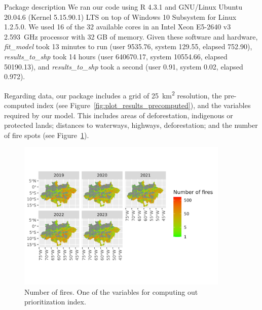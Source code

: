 \documentclass[20pt]{beamer}
\begin{document}
\begin{frame}[fragile,t]
\begin{columns}[t]
\begin{column}{0.33\linewidth}
\begin{block}{Package description}
We ran our code using \textsf{R} 4.3.1 and GNU/Linux Ubuntu 20.04.6 (Kernel 5.15.90.1) LTS on top of Windows 10 Subsystem for Linux 1.2.5.0. 
We used 16 of the 32 available cores in an Intel Xeon E5-2640 v3 2.593~GHz processor with 32 GB of memory.
Given these software and hardware, \textit{fit\_model} took 13 minutes to run (user 9535.76, system 129.55, elapsed 752.90),  \textit{results\_to\_shp} took 14 hours (user 640670.17, system 10554.66, elapsed 50190.13), and \textit{results\_to\_shp} took a second (user 0.91,  system 0.02, elapsed 0.972).

Regarding data, our package includes 
a grid of 25~\unit{\km\squared} resolution, the pre-computed index (see Figure~\ref{fig:plot_results_precomputed}),
and the variables required by our model. 
This includes areas of deforestation, indigenous or protected lands; distances to waterways, highways, deforestation; and the number of fire spots (see Figure~\ref{fig:plot_fires}).

\vspace{1cm}
\begin{figure}[ht]
\centering
\includegraphics[width=0.9\textwidth,trim={0 1cm 0 2cm},clip] 
{fig_poster/plot_fires.png}
\caption{Number of fires. One of the variables for computing out prioritization index.}
\label{fig:plot_fires}
\end{figure}
\vspace{0.6cm}


   
    \end{block}
\end{column}







\end{columns}
\end{frame}
\end{document}
